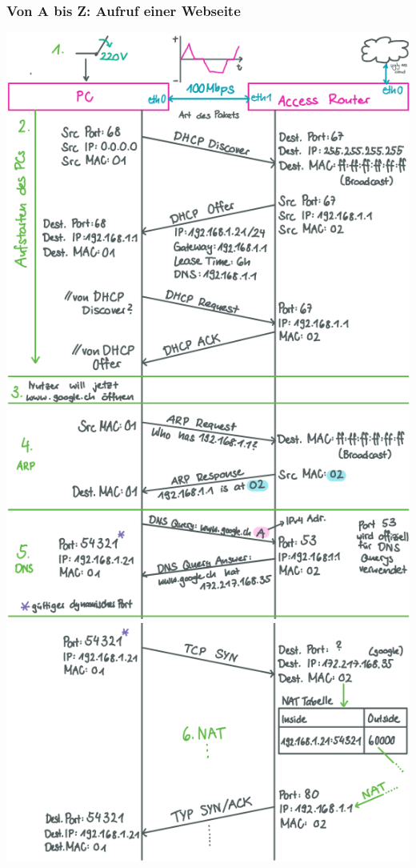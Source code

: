 \subsubsection*{Von A bis Z: Aufruf einer Webseite}

\includegraphics[width=1\linewidth]{images/atoz1.png}\\
\includegraphics[width=1\linewidth]{images/atoz2.png}



